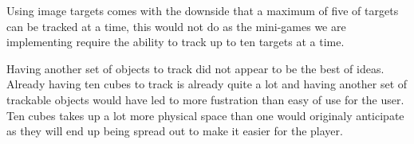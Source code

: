 Using image targets comes with the downside that a maximum of five of targets can be tracked at a time, this would not do as the mini-games we are implementing require the ability to track up to ten targets at a time.

Having another set of objects to track did not appear to be the best of ideas. 
Already having ten cubes to track is already quite a lot and having another set of trackable objects would have led to more fustration than easy of use for the user.
Ten cubes takes up a lot more physical space than one would originaly anticipate as they will end up being spread out to make it easier for the player.

